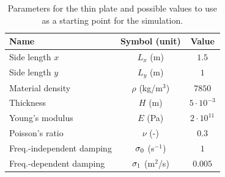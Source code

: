 \begin{table}[h]
    \begin{center}
    \begin{tabular}{|l|c|c|}
        \hline
        Name & Symbol (unit) & Value\\ \hline
        Side length $x$ & $L_x$ (m) & $1.5$\\
        Side length $y$  & $L_y$ (m) & $1$\\
        Material density & $\rho$ (kg/m$^3$) & $7850$\\
        Thickness & $H$ (m) & $5\cdot10^{-3}$\\
        Young's modulus & $E$ (Pa) & $2\cdot10^{11}$\\
        Poisson's ratio & $\nu$ (-)& $0.3$\\
        Freq.-independent damping & $\sigma_{0}$ (s$^{-1}$) & $1$\\
        Freq.-dependent damping & $\sigma_{1}$ (m$^2$/s) & $0.005$\\\hline
    \end{tabular}
    \caption{Parameters for the thin plate and possible values to use as a starting point for the simulation.\label{tab:thinPlateParams}}
    \end{center}
\end{table}
